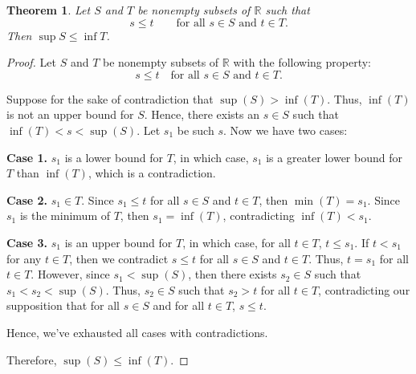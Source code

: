 \documentclass[11pt]{article}
\newtheorem{theorem}{Theorem}
\begin{document}
\begin{theorem}
Let \(S\) and \(T\) be nonempty subsets of \(\mathbb{R}\) such that
\[
s\leq t
\qquad\text{for all }s\in S\text{ and }t\in T.
\]
Then \(\sup S\leq\inf T\).
\end{theorem}

\begin{proof}
Let \(S\) and \(T\) be nonempty subsets of \(\mathbb{R}\) with the following property:
\[
s\leq t \quad\text{for all }s\in S\text{ and }t\in T.
\]

Suppose for the sake of contradiction that \(\sup(S)>\inf(T)\).
Thus, \(\inf(T)\) is not an upper bound for \(S\).
Hence, there exists an \(s\in S\) such that \(\inf(T)<s<\sup(S)\).
Let \(s_1\) be such \(s\).
Now we have two cases:

\textbf{Case 1.} \(s_1\) is a lower bound for \(T\), in which case, \(s_1\) is a greater lower bound for \(T\) than \(\inf(T)\), which is a contradiction.

\textbf{Case 2.} \(s_1\in T\).
Since \(s_1\leq t\) for all \(s\in S\) and \(t\in T\), then \(\min(T)=s_1\).
Since \(s_1\) is the minimum of \(T\), then \(s_1=\inf(T)\), contradicting \(\inf(T)<s_1\).

\textbf{Case 3.} \(s_1\) is an upper bound for \(T\), in which case, for all \(t\in T\), \(t\leq s_1\).
If \(t<s_1\) for any \(t\in T\), then we contradict \(s\leq t\) for all \(s\in S\) and \(t\in T\).
Thus, \(t=s_1\) for all \(t\in T\).
However, since \(s_1<\sup(S)\), then there exists \(s_2\in S\) such that \(s_1<s_2<\sup(S)\).
Thus, \(s_2\in S\) such that \(s_2>t\) for all \(t\in T\), contradicting our supposition that for all \(s\in S\) and for all \(t\in T\), \(s\leq t\).

Hence, we've exhausted all cases with contradictions.

Therefore, \(\sup(S)\leq\inf(T)\).
\end{proof}
\end{document}
